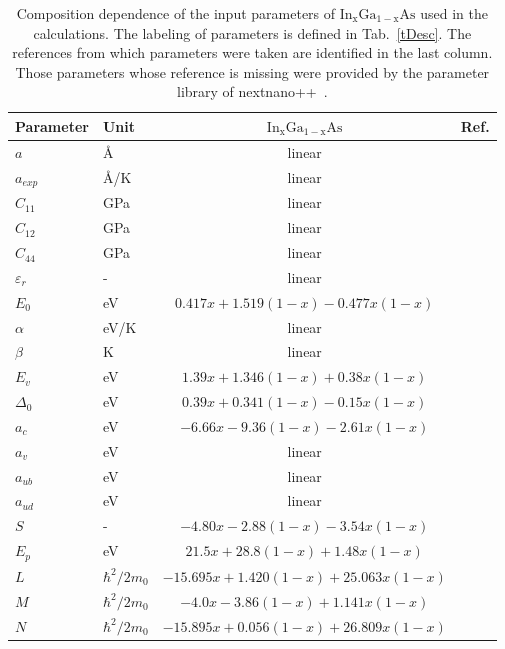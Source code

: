 
\begin{table*}[!ht]
	\begin{center}
		\begin{tabular}{llcc}
			\hline \hline
			Parameter & Unit & $\mathrm{In_xGa_{1-x}As}$ & Ref.\\
			\hline
			$a$ & \AA & linear & \\
			$a_{exp}$ & \AA /K & linear & \\
			$C_{11}$ & GPa& linear &  \\
			$C_{12}$ & GPa& linear &  \\
			$C_{44}$ & GPa& linear & \\
			$\varepsilon_{r}$ & -& linear & \\
			$E_0$ & eV & $0.417x+1.519(1-x)-0.477x(1-x)$ & \cite{Vurgaftman}\\
			$\alpha$ & eV/K & linear & \\
			$\beta$ & K & linear & \\
			$E_v$ & eV & $1.39x+1.346(1-x)+0.38x(1-x)$& \cite{Vurgaftman}\\
			$\Delta_0$ & eV & $0.39x+0.341(1-x)-0.15x(1-x)$& \cite{Vurgaftman}\\
			$a_c$ & eV & $-6.66x-9.36(1-x)-2.61x(1-x)$& \cite{Vurgaftman}\\
			$a_v$ & eV & linear & \\
			$a_{ub}$ & eV & linear& \\
			$a_{ud}$ & eV & linear& \\
			$S$ & -& $-4.80x-2.88(1-x)-3.54x(1-x)$& \cite{Vurgaftman}\\
			$E_p$ & eV & $21.5x+28.8(1-x)+1.48x(1-x)$& \cite{Vurgaftman}\\
			$L$ & $\hbar^2/2m_0$ & $-15.695x+1.420(1-x)+25.063x(1-x)$& \cite{Vurgaftman}\\
			$M$ & $\hbar^2/2m_0$ & $-4.0x-3.86(1-x)+1.141x(1-x)$& \cite{Vurgaftman}\\
			$N$ & $\hbar^2/2m_0$ & $-15.895x+0.056(1-x)+26.809x(1-x)$& \cite{Vurgaftman}\\
			\hline \hline
		\end{tabular}
	\end{center}
	\caption{Composition dependence of the input parameters of $\mathrm{In_xGa_{1-x}As}$ used in the calculations. The labeling of parameters is defined in Tab.~\ref{tDesc}. The references from which parameters were taken are identified in the last column. Those parameters whose reference is missing were provided by the parameter library of nextnano++~\cite{next}.\label{tSb3}
	}
\end{table*}

\newpage 